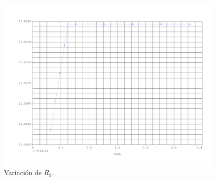 \begin{figure}[H]
	\centering
	\includegraphics[scale=0.5]{Figuras/2_var_R2.pdf}
	\caption{Variación de $R_2$.}
	\label{fig:var_R1}
\end{figure}




